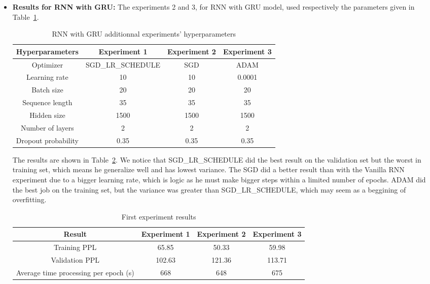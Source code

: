 \begin{itemize}
	\item[2)] \textbf{Results for RNN with GRU:}
	The experiments 2 and 3, for RNN with GRU model, used respectively the parameters given in Table~\ref{table:4}.\\
	\begin{table}[H]
		\centering
		\begin{tabular}{||c c c c||} 
			\hline
			\textbf{Hyperparameters} &\textbf{Experiment 1} & \textbf{Experiment 2} & \textbf{Experiment 3}\\[0.5ex] 
			\hline
			Optimizer & SGD\_LR\_SCHEDULE & SGD & ADAM \\
			Learning rate & 10 & 10 & 0.0001   \\
			Batch size & 20 & 20 &20 \\
			Sequence length & 35 & 35 & 35\\
			Hidden size & 1500 & 1500 & 1500 \\
			Number of layers & 2 & 2 & 2 \\
			Dropout probability & 0.35 & 0.35 &0.35 \\[1ex]
			\hline
		\end{tabular}
		\caption{RNN with GRU additionnal experiments' hyperparameters}
		\label{table:4}
	\end{table}
	The results are shown in Table~\ref{table:4.1}. We notice that SGD\_LR\_SCHEDULE did the best result on the validation set but the worst in training set, which means he generalize well and has lowest variance. The SGD did a better result than with the Vanilla RNN experiment due to a bigger learning rate, which is logic as he must make bigger steps within a limited number of epochs. ADAM did the best job on the training set, but the variance was greater than SGD\_LR\_SCHEDULE, which may seem as a beggining of overfitting.
	\begin{table}[H]
		\centering
		\begin{tabular}{||c c c c||} 
			\hline
			\textbf{Result} & \textbf{Experiment 1} & \textbf{Experiment 2}& \textbf{Experiment 3} \\[0.5ex] 
			\hline
			Training PPL & 65.85& 50.33& 59.98 \\
			Validation PPL & 102.63 & 121.36 & 113.71  \\
			Average time processing per epoch (s) & 668 & 648 & 675 \\[1ex]
			\hline
		\end{tabular}
		\caption{First experiment results}
		\label{table:4.1}
	\end{table}

\end{itemize}
